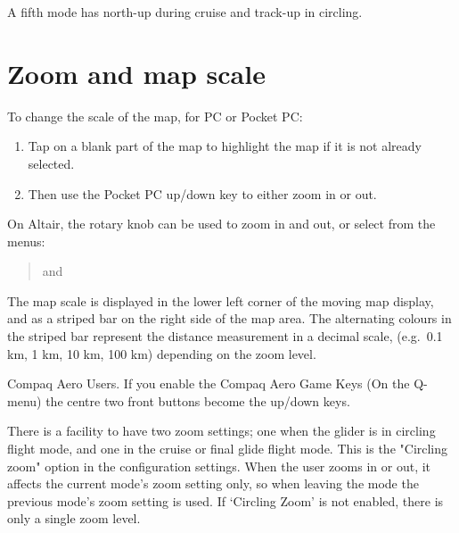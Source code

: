 \documentclass[a4paper,12pt]{refrep}
\begin{document}
A fifth mode has north-up during cruise and track-up in circling.

\section{Zoom and map scale}

To change the scale of the map, for PC or Pocket PC:
\begin{enumerate}
\item Tap on a blank part of the map to highlight the map if it is not already selected.
\item Then use the Pocket PC up/down key to either zoom in or out.
\end{enumerate}

On Altair, the rotary knob can be used to zoom in and out, or select
from the menus:
\begin{quote}
\blink{} and \blink{}
\end{quote}

The map scale is displayed in the lower left corner of the moving map
display, and as a striped bar on the right side of the map area.  The
alternating colours in the striped bar represent the distance
measurement in a decimal scale, (e.g.\ 0.1 km, 1 km, 10 km, 100 km)
depending on the zoom level.

Compaq Aero Users. If you enable the Compaq Aero Game Keys (On the
Q-menu) the centre two front buttons become the up/down keys.

There is a facility to have two zoom settings; one when the glider is
in circling flight mode, and one in the cruise or final glide flight
mode.  This is the "Circling zoom" option in the configuration
settings.  
When the user zooms in or out, it affects the current
mode's zoom setting only, so when leaving the mode the previous mode's
zoom setting is used.  If `Circling Zoom' is not enabled, there is
only a single zoom level.
\end{document}
